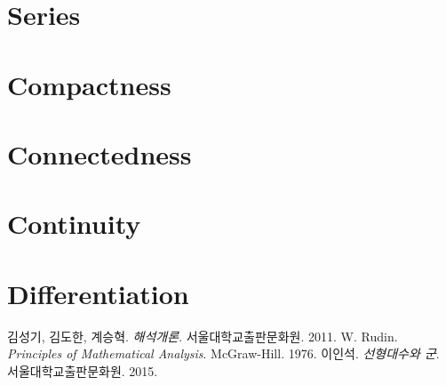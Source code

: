 \documentclass[12pt]{article}
\theoremstyle{definition}
\begin{document}
\section{Series}

\section{Compactness} \label{cpt}

\section{Connectedness}

\section{Continuity}

\section{Differentiation}


\begin{thebibliography}{99}
	
	\label{ref1} 김성기, 김도한, 계승혁. \emph{해석개론}. 서울대학교출판문화원. 2011.
	\label{ref2} W. Rudin. \emph{Principles of Mathematical Analysis}. McGraw-Hill. 1976.
	 이인석. \emph{선형대수와 군}. 서울대학교출판문화원. 2015.
		
\end{thebibliography}
\end{document}
